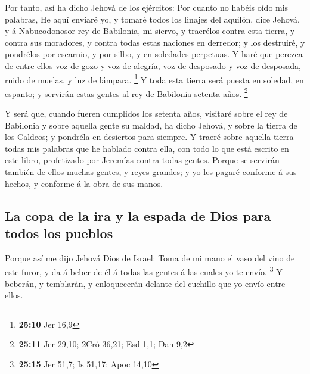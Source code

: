  Por tanto, así ha dicho Jehová de los ejércitos: Por
cuanto no habéis oído mis palabras,  He aquí enviaré yo, y
tomaré todos los linajes del aquilón, dice Jehová, y á Nabucodonosor rey
de Babilonia, mi siervo, y traerélos contra esta tierra, y contra sus
moradores, y contra todas estas naciones en derredor; y los destruiré, y
pondrélos por escarnio, y por silbo, y en soledades perpetuas.
 Y haré que perezca de entre ellos voz de gozo y voz de
alegría, voz de desposado y voz de desposada, ruido de muelas, y luz de
lámpara. \footnote{\textbf{25:10} Jer 16,9}  Y toda esta
tierra será puesta en soledad, en espanto; y servirán estas gentes al
rey de Babilonia setenta años. \footnote{\textbf{25:11} Jer 29,10; 2Cró
  36,21; Esd 1,1; Dan 9,2}

 Y será que, cuando fueren cumplidos los setenta años,
visitaré sobre el rey de Babilonia y sobre aquella gente su maldad, ha
dicho Jehová, y sobre la tierra de los Caldeos; y pondréla en desiertos
para siempre.  Y traeré sobre aquella tierra todas mis
palabras que he hablado contra ella, con todo lo que está escrito en
este libro, profetizado por Jeremías contra todas gentes.
 Porque se servirán también de ellos muchas gentes, y
reyes grandes; y yo les pagaré conforme á sus hechos, y conforme á la
obra de sus manos.

\hypertarget{la-copa-de-la-ira-y-la-espada-de-dios-para-todos-los-pueblos}{%
\subsection{La copa de la ira y la espada de Dios para todos los
pueblos}\label{la-copa-de-la-ira-y-la-espada-de-dios-para-todos-los-pueblos}}

 Porque así me dijo Jehová Dios de Israel: Toma de mi
mano el vaso del vino de este furor, y da á beber de él á todas las
gentes á las cuales yo te envío. \footnote{\textbf{25:15} Jer 51,7; Is
  51,17; Apoc 14,10}  Y beberán, y temblarán, y
enloquecerán delante del cuchillo que yo envío entre ellos.


